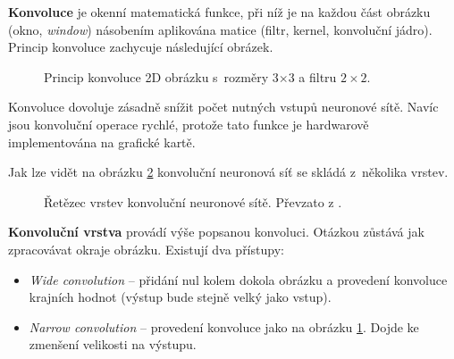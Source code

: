 \textbf{Konvoluce} je okenní matematická funkce, při níž je na každou část obrázku (okno, \emph{window}) násobením aplikována matice (filtr, kernel, konvoluční jádro). Princip konvoluce zachycuje následující obrázek.

\begin{figure}[H]
  \begin{center}
  \label{obrazek:principkonvoluce}
  \caption{Princip konvoluce 2D obrázku s~rozměry 3$\times$3 a filtru $2\times2$.}
  \end{center}
\end{figure}

Konvoluce dovoluje zásadně snížit počet nutných vstupů neuronové sítě. Navíc jsou konvoluční operace rychlé, protože tato funkce je hardwarově implementována na grafické kartě.

Jak lze vidět na obrázku \ref{obrazek:cnnpipeline} konvoluční neuronová síť se skládá z~několika vrstev.

\begin{figure}[H]
  \begin{center}
  \label{obrazek:cnnpipeline}
  \caption{Řetězec vrstev konvoluční neuronové sítě. Převzato z \cite{cnnNlp}.}
  \end{center}
\end{figure}

\textbf{Konvoluční vrstva} provádí výše popsanou konvoluci. Otázkou zůstává jak zpracovávat okraje obrázku. Existují dva přístupy:

\begin{itemize}
  \item \emph{Wide convolution} -- přidání nul kolem dokola obrázku a provedení konvoluce krajních hodnot (výstup bude stejně velký jako vstup).
  \item \emph{Narrow convolution} -- provedení konvoluce jako na obrázku \ref{obrazek:principkonvoluce}. Dojde ke zmenšení velikosti na výstupu.
\end{itemize}

